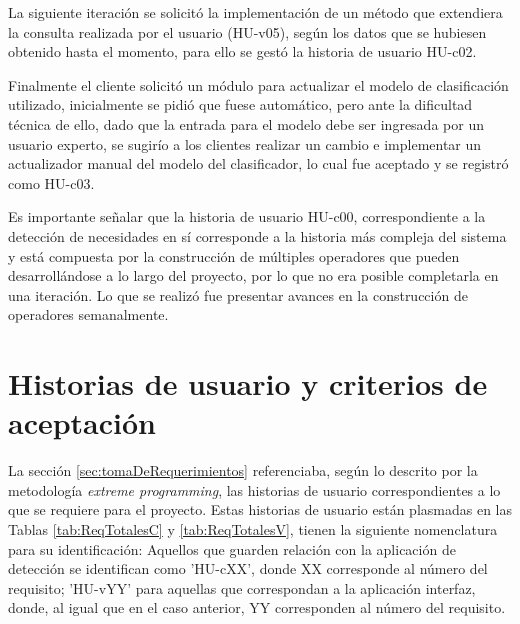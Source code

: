 La siguiente iteración se solicitó la implementación de un método que extendiera la consulta realizada por el usuario (HU-v05), según los datos que se hubiesen obtenido hasta el momento, para ello se gestó la historia de usuario HU-c02.

Finalmente el cliente solicitó un módulo para actualizar el modelo de clasificación utilizado, inicialmente se pidió que fuese automático, pero ante la dificultad técnica de ello, dado que la entrada para el modelo debe ser ingresada por un usuario experto, se sugirío a los clientes realizar un cambio e implementar un actualizador manual del modelo del clasificador, lo cual fue aceptado y se registró como HU-c03.

Es importante señalar que la historia de usuario HU-c00, correspondiente a la detección de necesidades en sí corresponde a la historia más compleja del sistema y está compuesta por la construcción de múltiples operadores que pueden desarrollándose a lo largo del proyecto, por lo que no era posible completarla en una iteración. Lo que se realizó fue presentar avances en la construcción de operadores semanalmente.

\section{Historias de usuario y criterios de aceptación}
\label{sec:historias}

La sección \ref{sec:tomaDeRequerimientos} referenciaba, según lo descrito por la metodología \textit{extreme programming}, las historias de usuario correspondientes a lo que se requiere para el proyecto. Estas historias de usuario están plasmadas en las Tablas \ref{tab:ReqTotalesC} y \ref{tab:ReqTotalesV}, tienen la siguiente nomenclatura para su identificación: Aquellos que guarden relación con la aplicación de detección se identifican como 'HU-cXX', donde XX corresponde al número del requisito; 'HU-vYY' para aquellas que correspondan a la aplicación interfaz, donde, al igual que en el caso anterior, YY corresponden al número del requisito.

